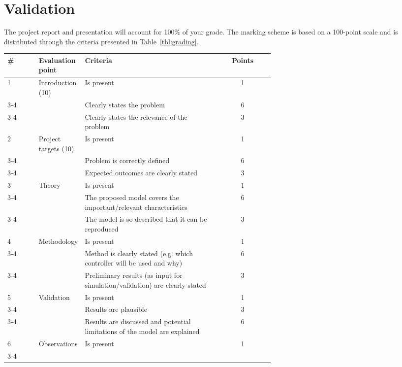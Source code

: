 \documentclass[a4paper, 10pt]{IEEEtran}
\begin{document}
	\section{Validation}
	
	The project report and presentation will account for 100\% of your grade. The marking scheme is based on a 100-point scale and is distributed through the criteria presented in Table~\ref{tbl:grading}.
	
	\begin{table*}[h]
		\caption{Grading scheme for projects in SoSe 2020}\label{tbl:grading}
		\centering
		\begin{tabular}{l p{0.13\linewidth} p{0.5\linewidth} c}
			\hline
			\bfseries \# & \bfseries Evaluation point & \bfseries Criteria & \bfseries Points \\
			\hline
			1 & Introduction (10) & Is present & 1 \\
			\cline{3-4}
			 & & Clearly states the problem & 6 \\
			 \cline{3-4}
			 & & Clearly states the relevance of the problem & 3\\
			 \hline
			 2 & Project targets (10) & Is present & 1 \\
			 \cline{3-4}
			 & & Problem is correctly defined & 6 \\
			\cline{3-4}
			 & & Expected outcomes are clearly stated & 3 \\
			 \hline
			 3 & Theory & Is present & 1 \\
			\cline{3-4}
			 & & The proposed model covers the important/relevant characteristics & 6 \\
			\cline{3-4}
			 & & The model is so described that it can be reproduced & 3\\
			 \hline
			 4 & Methodology & Is present & 1 \\
			\cline{3-4}
			 & & Method is clearly stated (e.g. which controller will be used and why) & 6 \\
			\cline{3-4}
			 & & Preliminary results (as input for simulation/validation) are clearly stated & 3\\
			 \hline
			 5 & Validation & Is present & 1 \\
			\cline{3-4}
			  & & Results are plausible & 3\\
			\cline{3-4}
			  & & Results are discussed and potential limitations of the model are explained & 6\\
			 \hline
			 6 & Observations & Is present & 1\\
			\cline{3-4}

\end{tabular}
\end{table*}
\end{document}
